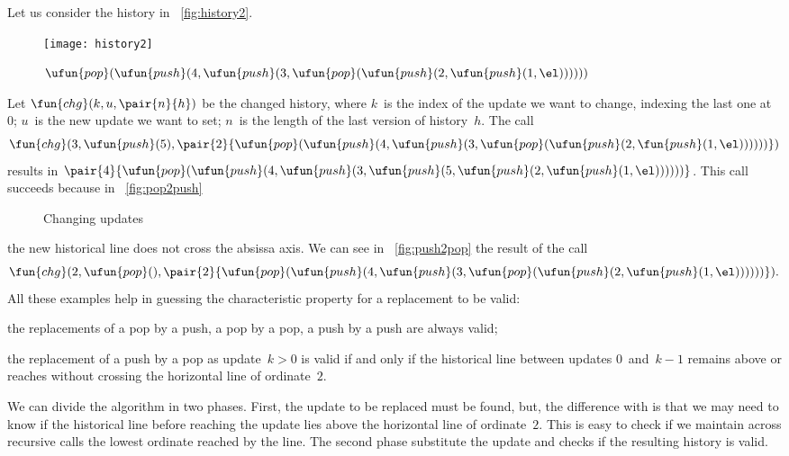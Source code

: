 Let us consider the history in \fig~\vref{fig:history2}.
\begin{figure}
\centering
\texttt{[image: history2]}%
\caption{$\ufun{pop}(\ufun{push}(4,\ufun{push}(3,
          \ufun{pop}(\ufun{push}(2,\ufun{push}(1,\el))))))$}
\label{fig:history2}
\end{figure}
Let \(\fun{chg}(k,u,\pair{n}{h})\) be the
changed history, where \(k\)~is the index of the update we want to
change, indexing the last one at~\(0\); \(u\)~is the new update we
want to set; \(n\)~is the length of the last version of
history~\(h\). The call
\begin{equation*}
\fun{chg}(3,\ufun{push}(5),
  \pair{2}{\ufun{pop}(\ufun{push}(4,\ufun{push}(3,
           \ufun{pop}(\ufun{push}(2,\fun{push}(1,\el))))))})
\end{equation*}
results in
\(\pair{4}{\ufun{pop}(\ufun{push}(4,\ufun{push}(3,\ufun{push}(5,
  \ufun{push}(2,\ufun{push}(1,\el))))))}\). \!\!This call succeeds
because in \fig~\ref{fig:pop2push}
\begin{figure}
\centering
{}
\quad
{}
\caption{Changing updates}
\end{figure}
the new historical line does not cross the absissa axis. We can see in
\fig~\ref{fig:push2pop} the result of the call
\begin{equation*}
\fun{chg}(2,\ufun{pop}(),
            \pair{2}{\ufun{pop}(\ufun{push}(4,\ufun{push}(3,
                     \ufun{pop}(\ufun{push}(2,\ufun{push}(1,\el))))))}).
\end{equation*}
All these examples help in guessing the characteristic property for a
replacement to be valid:
\begin{itemize*}

  \item the replacements of a pop by a push, a pop by a pop, a push by
    a push are always valid;

  \item the replacement of a push by a pop as update~\(k>0\) is valid
    if and only if the historical line between updates
    \(0\)~and~\(k-1\) remains above or reaches without crossing the
    horizontal line of ordinate~\(2\).

\end{itemize*}
We can divide the algorithm in two phases. First, the update to be
replaced must be found, but, the difference with  is
that we may need to know if the historical line before reaching the
update lies above the horizontal line of ordinate~\(2\). This is easy
to check if we maintain across recursive calls the lowest ordinate
reached by the line. The second phase substitute the update and checks
if the resulting history is valid.

